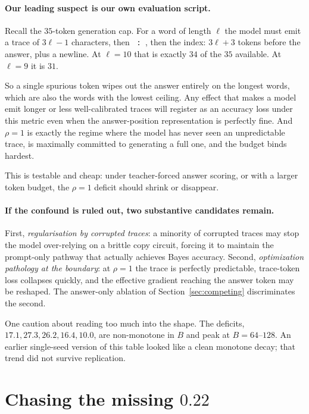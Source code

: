 \documentclass{article}
\theoremstyle{plain}
\theoremstyle{definition}
\theoremstyle{remark}
\newcommand{\1}{\mathbf{1}}
\begin{document}
\paragraph{Our leading suspect is our own evaluation script.}
Recall the $35$-token generation cap. For a word of length $\ell$ the model must
emit a trace of $3\ell-1$ characters, then \texttt{ : }, then the index: $3\ell+3$
tokens before the answer, plus a newline. At $\ell=10$ that is exactly $34$ of
the $35$ available. At $\ell=9$ it is $31$.

So a single spurious token wipes out the answer entirely on the longest words,
which are also the words with the lowest ceiling. Any effect that makes a model
emit longer or less well-calibrated traces will register as an accuracy loss
under this metric even when the answer-position representation is perfectly
fine. And $\rho=1$ is exactly the regime where the model has never seen an
unpredictable trace, is maximally committed to generating a full one, and the
budget binds hardest.

This is testable and cheap: under teacher-forced answer scoring, or with a larger
token budget, the $\rho=1$ deficit should shrink or disappear.

\paragraph{If the confound is ruled out, two substantive candidates remain.}
First, \emph{regularisation by corrupted traces}: a minority of corrupted traces
may stop the model over-relying on a brittle copy circuit, forcing it to maintain
the prompt-only pathway that actually achieves Bayes accuracy. Second,
\emph{optimization pathology at the boundary}: at $\rho=1$ the trace is perfectly
predictable, trace-token loss collapses quickly, and the effective gradient
reaching the answer token may be reshaped. The answer-only ablation of
Section~\ref{sec:competing} discriminates the second.

One caution about reading too much into the shape. The deficits, $17.1, 27.3,
26.2, 16.4, 10.0$, are non-monotone in $B$ and peak at $B=64$--$128$. An earlier
single-seed version of this table looked like a clean monotone decay; that trend
did not survive replication.

\section{Chasing the missing $0.22$}
\label{sec:gap}
\end{document}
